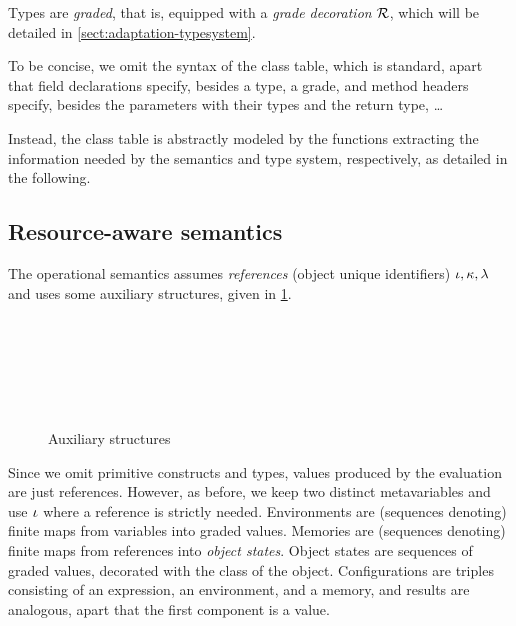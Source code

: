 Types are \emph{graded}, that is, equipped with a \emph{grade decoration} $\mathcal{R}$, which will be detailed in \cref{sect:adaptation-typesystem}.

To be concise, we omit the syntax of the class table, which is  
standard, apart that field declarations specify, besides a type, a grade, and method headers specify, besides the parameters with their types and the return type, \ldots

Instead, the class table is abstractly modeled by the functions extracting the information needed by the semantics and type system, respectively, as detailed in the following.

\subsection{Resource-aware semantics}\label{sect:semantics}
The operational semantics assumes \emph{references} (object unique identifiers)  $\iota, \kappa,\lambda$  and uses some auxiliary structures, given in \cref{fig:auxsem}. 
\begin{figure}
\begin{grammatica}
\\
\\
\\
\\
\\
\end{grammatica}
\caption{Auxiliary structures}
\label{fig:auxsem}
\end{figure}

Since we omit primitive constructs and types, values produced by the evaluation are just references. However, as before, we keep two distinct metavariables and use $\iota$ where a reference is strictly needed.
Environments are (sequences denoting) finite maps from variables into graded values. Memories are (sequences denoting) finite maps from references into \emph{object states}. Object states are sequences of graded values, decorated with the class of the object. Configurations are triples consisting of an expression, an environment, and a memory, and results are analogous, apart that the first component is a value.

